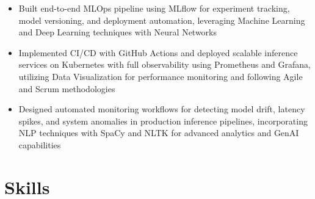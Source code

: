 \documentclass[11pt,a4paper]{article}
\begin{document}
    
    \vspace{1mm}
    \begin{itemize}[leftmargin=*, topsep=0pt, partopsep=0pt]
        \item Built end-to-end MLOps pipeline using MLflow for experiment tracking, model versioning, and deployment automation, leveraging Machine Learning and Deep Learning techniques with Neural Networks
        \item Implemented CI/CD with GitHub Actions and deployed scalable inference services on Kubernetes with full observability using Prometheus and Grafana, utilizing Data Visualization for performance monitoring and following Agile and Scrum methodologies
        \item Designed automated monitoring workflows for detecting model drift, latency spikes, and system anomalies in production inference pipelines, incorporating NLP techniques with SpaCy and NLTK for advanced analytics and GenAI capabilities
    \end{itemize}

\section*{Skills}








\end{document}
